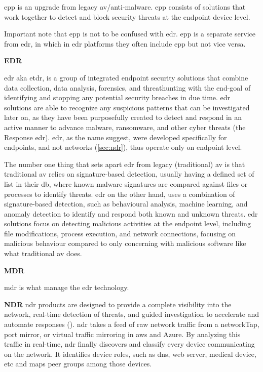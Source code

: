 \begin{multicols}{2}
      \acrshort{epp} is an upgrade from legacy \acrshort{av}/anti-malware. \acrshort{epp} consists of solutions that work together to detect
      and block security threats at the endpoint device level.

      Important note that \acrshort{epp} is not to be confused with \acrshort{edr}. \acrshort{epp} is a separate service from \acrshort{edr},
      in which in \acrshort{edr} platforms they often include \acrshort{epp} but not vice versa.

      \textbf{EDR}

      \acrshort{edr} \acrshort{aka} \acrshort{etdr}, is a group of integrated endpoint security solutions that combine data collection,
      data analysis, forensics, and \gls{threathunting} with the end-goal of identifying and stopping any potential security breaches in due
      time. \acrshort{edr} solutions are able to recognize any suspicious patterns that can be investigated later on, as they have been
      purposefully created to detect and respond in an active manner to advance malware, ransomware, and other cyber threats (the Response
      \acrshort{edr}). \acrshort{edr}, as the name suggest, were developed specifically for endpoints, and not networks (\ref{sec:ndr}), thus
      operate only on endpoint level.

      The number one thing that sets apart \acrshort{edr} from legacy (traditional) \acrshort{av} is that traditional \acrshort{av} relies on
      signature-based detection, usually having a defined set of list in their \acrshort{db}, where known malware signatures are compared
      against files or processes to identify threats. \acrshort{edr} on the other hand, uses a combination of signature-based detection, such
      as behavioural analysis, machine learning, and anomaly detection to identify and respond both known and unknown threats. \acrshort{edr}
      solutions focus on detecting malicious activities at the endpoint level, including file modifications, process execution, and network
      connections, focusing on malicious behaviour compared to only concerning with malicious software like what traditional \acrshort{av} does.

      \textbf{MDR}

      \acrshort{mdr} is what manage the \acrshort{edr} technology.

      \textbf{NDR} \label{sec:ndr}
      \acrshort{ndr} products are designed to provide a complete visibility into the network, real-time detection of threats, and guided
      investigation to accelerate and automate responses (\textit{\cite{sentinelOneNDR}}). \acrshort{ndr} takes a feed of raw network traffic
      from a \gls{networkTap}, port mirror, or virtual traffic mirroring in \acrshort{aws} and Azure. By analyzing this traffic in real-time,
      \acrshort{ndr} finally discovers and classify every device communicating on the network. It identifies device roles, such as \acrshort{dns},
      web server, medical device, \acrshort{etc} and maps peer groups among those devices.


\end{multicols}
